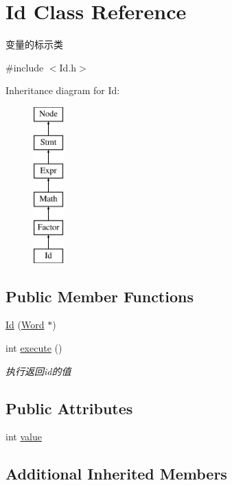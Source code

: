 \hypertarget{class_id}{}\section{Id Class Reference}
\label{class_id}


变量的标示类  




{\ttfamily \#include $<$Id.\+h$>$}

Inheritance diagram for Id\+:\begin{figure}[H]
\begin{center}
\leavevmode
\includegraphics[height=6.000000cm]{class_id}
\end{center}
\end{figure}
\subsection*{Public Member Functions}
\begin{DoxyCompactItemize}
\item 
\hyperlink{class_id_a22122a40c4a61b6d2f7d20a3cc7c7275}{Id} (\hyperlink{class_word}{Word} $\ast$)
\item 
int \hyperlink{class_id_ae43a9ffecbbc0ac4fd041b8e8e3c3de0}{execute} ()
\begin{DoxyCompactList}\small\item\em 执行返回id的值 \end{DoxyCompactList}\end{DoxyCompactItemize}
\subsection*{Public Attributes}
\begin{DoxyCompactItemize}
\item 
int \hyperlink{class_id_af7f7ed479b45ce150b88481b7b996e32}{value}
\end{DoxyCompactItemize}
\subsection*{Additional Inherited Members}


